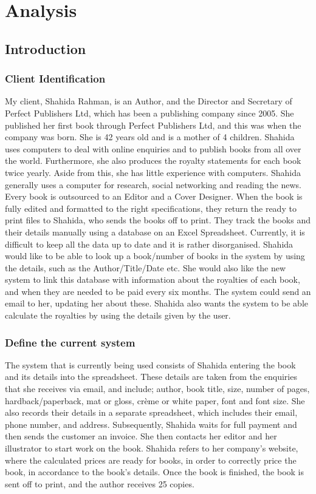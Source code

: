 
\chapter{Analysis}

\section{Introduction}

\subsection{Client Identification}
My client, Shahida Rahman, is an Author, and the Director and Secretary of Perfect Publishers Ltd, which has been a publishing company since 2005. She published her first book through Perfect Publishers Ltd, and this was when the company was born. She is 42 years old and is a mother of 4 children. Shahida uses computers to deal with online enquiries and to publish books from all over the world. Furthermore, she also produces the royalty statements for each book twice yearly. Aside from this, she has little experience with computers. Shahida generally uses a computer for research, social networking and reading the news. Every book is outsourced to an Editor and a Cover Designer. When the book is fully edited and formatted to the right specifications, they return the ready to print files to Shahida, who sends the books off to print. They track the books and their details manually using a database on an Excel Spreadsheet. Currently, it is difficult to keep all the data up to date and it is rather disorganised. Shahida would like to be able to look up a book/number of books in the system by using the details, such as the Author/Title/Date etc. She would also like the new system to link this database with information about the royalties of each book, and when they are needed to be paid every six months. The system could send an email to her, updating her about these. Shahida also wants the system to be able calculate the royalties by using the details given by the user.

\subsection{Define the current system}
The system that is currently being used consists of Shahida entering the book and its details into the spreadsheet. These details are taken from the enquiries that she receives via email, and include; author, book title, size, number of pages, hardback/paperback, mat or gloss, crème or white paper, font and font size. She also records their details in a separate spreadsheet, which includes their email, phone number, and address. Subsequently, Shahida waits for full payment and then sends the customer an invoice. She then contacts her editor and her illustrator to start work on the book. Shahida refers to her company's website, where the calculated prices are ready for books, in order to correctly price the book, in accordance to the book’s details. Once the book is finished, the book is sent off to print, and the author receives 25 copies.

